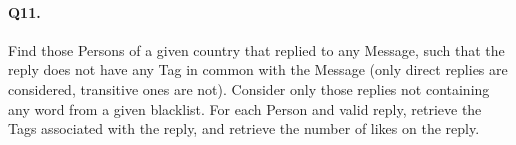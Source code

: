 \paragraph{Q11.}
Find those Persons of a given country that replied to any Message, such
that the reply does not have any Tag in common with the Message (only
direct replies are considered, transitive ones are not). Consider only
those replies not containing any word from a given blacklist. For each
Person and valid reply, retrieve the Tags associated with the reply, and
retrieve the number of likes on the reply.
